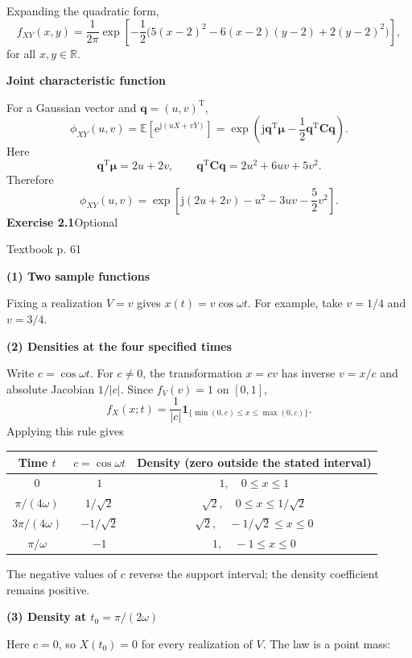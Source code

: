 \documentclass[a4paper,11pt]{article}
\newcommand{\E}{\mathbb E}\newcommand{\Var}{\operatorname{Var}}\newcommand{\Cov}{\operatorname{Cov}}
\newcommand{\jj}{\mathrm j}\newcommand{\ee}{\mathrm e}
\newcommand{\problem}[3]{{\LARGE\bfseries Exercise #1}\hfill #2\par{\small\color{gray}Textbook p. #3}\par\vspace{3mm}}
\newcommand{\step}[1]{\par\textbf{#1}\par}
\begin{document}
Expanding the quadratic form,
\[
\boxed{f_{XY}(x,y)=\frac1{2\pi}\exp\left[-\frac12\bigl(5(x-2)^2-6(x-2)(y-2)+2(y-2)^2\bigr)\right],}
\]
for all $x,y\in\mathbb R$.
\step{Joint characteristic function}
For a Gaussian vector and $\boldsymbol q=(u,v)^{\mathrm T}$,
\[
\phi_{XY}(u,v)=\E[\ee^{\jj(uX+vY)}]
=\exp\left(\jj\boldsymbol q^{\mathrm T}\boldsymbol\mu-\frac12\boldsymbol q^{\mathrm T}\boldsymbol C\boldsymbol q\right).
\]
Here
\[
\boldsymbol q^{\mathrm T}\boldsymbol\mu=2u+2v,\qquad
\boldsymbol q^{\mathrm T}\boldsymbol C\boldsymbol q=2u^2+6uv+5v^2.
\]
Therefore
\[
\boxed{\phi_{XY}(u,v)=\exp\left[\jj(2u+2v)-u^2-3uv-\frac52v^2\right].}
\]
\newpage
\problem{2.1}{Optional}{61}
\step{(1) Two sample functions}
Fixing a realization $V=v$ gives $x(t)=v\cos\omega t$. For example, take $v=1/4$ and $v=3/4$.
\begin{center}
\end{center}
\step{(2) Densities at the four specified times}
Write $c=\cos\omega t$. For $c\ne0$, the transformation $x=cv$ has inverse $v=x/c$ and absolute Jacobian $1/|c|$. Since $f_V(v)=1$ on $[0,1]$,
\[
f_X(x;t)=\frac1{|c|}\mathbf1_{\{\min(0,c)\le x\le\max(0,c)\}}.
\]
Applying this rule gives
\begin{center}\renewcommand{\arraystretch}{1.6}
\begin{tabular}{c c c}\toprule
Time $t$ & $c=\cos\omega t$ & Density (zero outside the stated interval)\\\midrule
$0$ & $1$ & $1,\quad 0\le x\le1$\\
$\pi/(4\omega)$ & $1/\sqrt2$ & $\sqrt2,\quad 0\le x\le1/\sqrt2$\\
$3\pi/(4\omega)$ & $-1/\sqrt2$ & $\sqrt2,\quad-1/\sqrt2\le x\le0$\\
$\pi/\omega$ & $-1$ & $1,\quad-1\le x\le0$\\\bottomrule
\end{tabular}\end{center}
The negative values of $c$ reverse the support interval; the density coefficient remains positive.
\step{(3) Density at $t_0=\pi/(2\omega)$}
Here $c=0$, so $X(t_0)=0$ for every realization of $V$. The law is a point mass:
\end{document}
